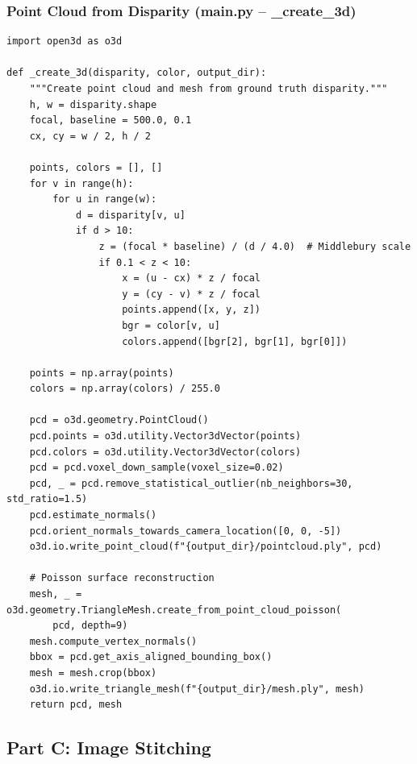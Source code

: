 \documentclass[a4paper,12pt]{article}
\begin{document}
\subsubsection*{Point Cloud from Disparity (main.py -- \_create\_3d)}
\begin{lstlisting}
import open3d as o3d

def _create_3d(disparity, color, output_dir):
    """Create point cloud and mesh from ground truth disparity."""
    h, w = disparity.shape
    focal, baseline = 500.0, 0.1
    cx, cy = w / 2, h / 2

    points, colors = [], []
    for v in range(h):
        for u in range(w):
            d = disparity[v, u]
            if d > 10:
                z = (focal * baseline) / (d / 4.0)  # Middlebury scale
                if 0.1 < z < 10:
                    x = (u - cx) * z / focal
                    y = (cy - v) * z / focal
                    points.append([x, y, z])
                    bgr = color[v, u]
                    colors.append([bgr[2], bgr[1], bgr[0]])

    points = np.array(points)
    colors = np.array(colors) / 255.0

    pcd = o3d.geometry.PointCloud()
    pcd.points = o3d.utility.Vector3dVector(points)
    pcd.colors = o3d.utility.Vector3dVector(colors)
    pcd = pcd.voxel_down_sample(voxel_size=0.02)
    pcd, _ = pcd.remove_statistical_outlier(nb_neighbors=30, std_ratio=1.5)
    pcd.estimate_normals()
    pcd.orient_normals_towards_camera_location([0, 0, -5])
    o3d.io.write_point_cloud(f"{output_dir}/pointcloud.ply", pcd)

    # Poisson surface reconstruction
    mesh, _ = o3d.geometry.TriangleMesh.create_from_point_cloud_poisson(
        pcd, depth=9)
    mesh.compute_vertex_normals()
    bbox = pcd.get_axis_aligned_bounding_box()
    mesh = mesh.crop(bbox)
    o3d.io.write_triangle_mesh(f"{output_dir}/mesh.ply", mesh)
    return pcd, mesh
\end{lstlisting}

\subsection{Part C: Image Stitching}
\end{document}
